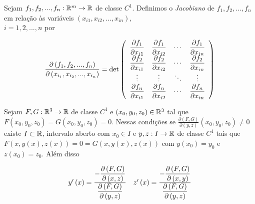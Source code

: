 \documentclass{book}
\begin{document}
\begin{defn}[Jacobiano]
Sejam $f_1 ,f_2 ,...,f_n :\mathbb{R}^m  \to \mathbb{R}$ de classe $C^1$. Definimos o \textit{Jacobiano} de $f_1 ,f_2 ,...,f_n$ em rela\c c\~ao \`as vari\'aveis $\left( {x_{i1 } ,x_{i2 } ,...,x_{in } } \right),$\\
$i = 1,2,...,n$ por

\[
\frac{{\partial \left( {f_1 ,f_2 ,...,f_n } \right)}}
{{\partial \left( {x_{i_1 } ,x_{i_2 } ,...,x_{i_n } } \right)}} = \det \left( {\begin{array}{*{20}c}
   \displaystyle {\frac{{\partial f_1 }}{{\partial x_{i1} }}} & \displaystyle {\frac{{\partial f_1 }}{{\partial x_{i2} }}} &  \cdots  & \displaystyle {\frac{{\partial f_1 }}{{\partial x_{in} }}}  \\
   \displaystyle {\frac{{\partial f_2 }}{{\partial x_{i1} }}} & \displaystyle {\frac{{\partial f_2 }}{{\partial x_{i2} }}} &  \cdots  & \displaystyle {\frac{{\partial f_2 }}{{\partial x_{in} }}}  \\
\vdots  &  \vdots  &  \ddots  &  \vdots   \\
   \displaystyle {\frac{{\partial f_n }}{{\partial x_{i1} }}} & \displaystyle {\frac{{\partial f_n }}{{\partial x_{i2} }}} &  \cdots  & \displaystyle {\frac{{\partial f_n }}{{\partial x_{in} }}}  \\

\end{array} } \right)
\]

\end{defn}

\begin{teo} \label{t4}
    Sejam $F,G:\mathbb{R}^3 \to \mathbb{R}$ de classe $C^1$ e $\left( {x_0 ,y_0 ,z_0 } \right) \in \mathbb{R}^3$ tal que $F\left( {x_0 ,y_0 ,z_0 } \right) = G\left( {x_0 ,y_0 ,z_0 } \right) = 0$. Nessas condi\c c\~oes se $\frac{{\partial \left( {F,G} \right)}}
{{\partial \left( {y,z} \right)}}\left( {x_0 ,y_0 ,z_0 } \right) \ne 0$ existe $I \subset \mathbb{R}$, intervalo aberto com $x_0 \in I$ e $y,z: I \to \mathbb{R}$ de classe $C^1$ tais que $F\left( {x,y\left( x \right),z\left( x \right)} \right) = 0 = G\left( {x,y\left( x \right),z\left( x \right)} \right)$ com $y\left( {x_0 } \right) = y_0$ e $z\left( {x_0 } \right) = z_0$. Al\'em disso

\[
\begin{array}{*{20}c}
   {y'\left( x \right) = \frac{{\displaystyle - \frac{{\partial \left( {F,G} \right)}}
{{\partial \left( {x,z} \right)}}}}
{{\displaystyle \frac{{\partial \left( {F,G} \right)}}
{{\partial \left( {y,z} \right)}}}}} & {z'\left( x \right) = \frac{{\displaystyle - \frac{{\partial \left( {F,G} \right)}}
{{\partial \left( {x,y} \right)}}}}
{{\displaystyle \frac{{\partial \left( {F,G} \right)}}
{{\partial \left( {y,z} \right)}}}}}  \\

\end{array}
\]

\end{teo}
\end{document}
